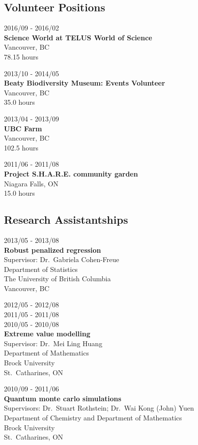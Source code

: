 \documentclass[]{article}
\begin{document}
\hypertarget{volunteer-positions}{%
\subsection{Volunteer Positions}\label{volunteer-positions}}

2016/09 - 2016/02\\
\textbf{Science World at TELUS World of Science }\\
Vancouver, BC\\
78.15 hours

2013/10 - 2014/05\\
\textbf{Beaty Biodiversity Museum: Events Volunteer}\\
Vancouver, BC\\
35.0 hours

2013/04 - 2013/09\\
\textbf{UBC Farm}\\
Vancouver, BC\\
102.5 hours

2011/06 - 2011/08\\
\textbf{Project S.H.A.R.E. community garden}\\
Niagara Falls, ON\\
15.0 hours

\hypertarget{research-assistantships}{%
\subsection{Research Assistantships}\label{research-assistantships}}

2013/05 - 2013/08\\
\textbf{Robust penalized regression}\\
Supervisor: Dr.~Gabriela Cohen-Freue\\
Department of Statistics\\
The University of British Columbia\\
Vancouver, BC

2012/05 - 2012/08\\
2011/05 - 2011/08\\
2010/05 - 2010/08\\
\textbf{Extreme value modelling}\\
Supervisor: Dr.~Mei Ling Huang\\
Department of Mathematics\\
Brock University\\
St.~Catharines, ON

2010/09 - 2011/06\\
\textbf{Quantum monte carlo simulations}\\
Supervisors: Dr.~Stuart Rothstein; Dr.~Wai Kong (John) Yuen\\
Department of Chemistry and Department of Mathematics\\
Brock University\\
St.~Catharines, ON
\end{document}

